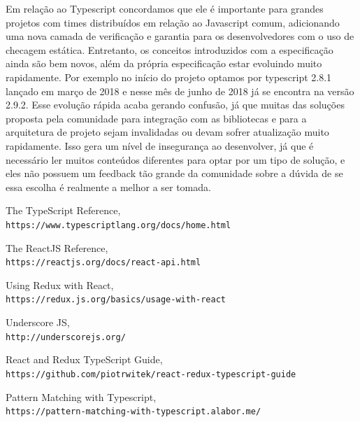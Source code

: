 \documentclass[rel_mlp]{iiufrgs}
\begin{document}
Em relação ao Typescript concordamos que ele é importante para grandes projetos com times distribuídos em relação ao Javascript comum, adicionando  uma nova camada de verificação e garantia para os desenvolvedores com o uso de checagem estática. Entretanto, os conceitos introduzidos com a especificação ainda são bem novos, além da própria especificação estar evoluindo muito rapidamente. Por exemplo no início do projeto optamos por typescript 2.8.1 lançado em março de 2018 e nesse mês de junho de 2018 já se encontra na versão 2.9.2. Esse evolução rápida acaba gerando confusão, já que muitas das soluções proposta pela comunidade para integração com as bibliotecas e para a arquitetura de projeto sejam invalidadas ou devam sofrer atualização muito rapidamente. Isso gera um nível de insegurança ao desenvolver, já que é necessário ler muitos conteúdos diferentes para optar por um tipo de solução, e eles não possuem um feedback tão grande da comunidade sobre a dúvida de se essa escolha é realmente a melhor a ser tomada.



\begin{thebibliography}{9}
The TypeScript Reference,
\\\texttt{https://www.typescriptlang.org/docs/home.html}

The ReactJS Reference,
\\\texttt{https://reactjs.org/docs/react-api.html}


Using Redux with React,
\\\texttt{https://redux.js.org/basics/usage-with-react}

Underscore JS,
\\\texttt{http://underscorejs.org/}

React and Redux TypeScript Guide,
\\\texttt{https://github.com/piotrwitek/react-redux-typescript-guide}

Pattern Matching with Typescript,
\\\texttt{https://pattern-matching-with-typescript.alabor.me/}



\end{thebibliography}
\end{document}

